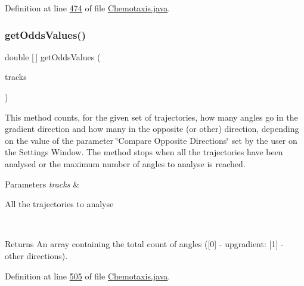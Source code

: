 Definition at line \hyperlink{_chemotaxis_8java_source_l00474}{474} of file \hyperlink{_chemotaxis_8java_source}{Chemotaxis.\+java}.

\hypertarget{classanalysis_1_1_chemotaxis_a02c2fbfd2097bca3933e285e6712a58d}{}\label{classanalysis_1_1_chemotaxis_a02c2fbfd2097bca3933e285e6712a58d} 
\subsubsection{\texorpdfstring{get\+Odds\+Values()}{getOddsValues()}}
{\footnotesize\ttfamily double \mbox{[}$\,$\mbox{]} get\+Odds\+Values (\begin{DoxyParamCaption}\item[{\hyperlink{classdata_1_1_serializable_list}{Serializable\+List}}]{tracks }\end{DoxyParamCaption})\hspace{0.3cm}{\ttfamily [private]}}

This method counts, for the given set of trajectories, how many angles go in the gradient direction and how many in the opposite (or other) direction, depending on the value of the parameter \char`\"{}\+Compare Opposite
\+Directions\char`\"{} set by the user on the Settings Window. The method stops when all the trajectories have been analysed or the maximum number of angles to analyse is reached.


\begin{DoxyParams}{Parameters}
{\em tracks} & 
\begin{DoxyItemize}
\item All the trajectories to analyse 
\end{DoxyItemize}\\
\hline
\end{DoxyParams}
\begin{DoxyReturn}{Returns}
An array containing the total count of angles (\mbox{[}0\mbox{]} -\/ upgradient\+: \mbox{[}1\mbox{]} -\/ other directions). 
\end{DoxyReturn}


Definition at line \hyperlink{_chemotaxis_8java_source_l00505}{505} of file \hyperlink{_chemotaxis_8java_source}{Chemotaxis.\+java}.

\hypertarget{classanalysis_1_1_chemotaxis_a973011dfbed998ea23443c2b79ac9ee3}{}\label{classanalysis_1_1_chemotaxis_a973011dfbed998ea23443c2b79ac9ee3} 
